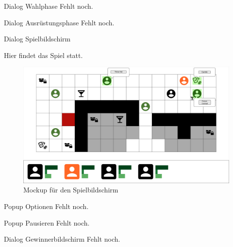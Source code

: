 Dialog \glqq{}Wahlphase\grqq{}
Fehlt noch.

Dialog \glqq{}Ausrüstungsphase\grqq{}
Fehlt noch.

Dialog \glqq{}Spielbildschirm\grqq{}

Hier findet das Spiel statt.

\begin{figure}
  \centering
  \includegraphics[width=\textwidth]{Meilenstein03/Game_Mockup.png}
  \caption{Mockup für den Spielbildschirm}
\end{figure}

Popup \glqq{}Optionen\grqq{}
Fehlt noch.

Popup \glqq{}Pausieren\grqq{}
Fehlt noch.

Dialog \glqq{}Gewinnerbildschirm\grqq{}
Fehlt noch.
